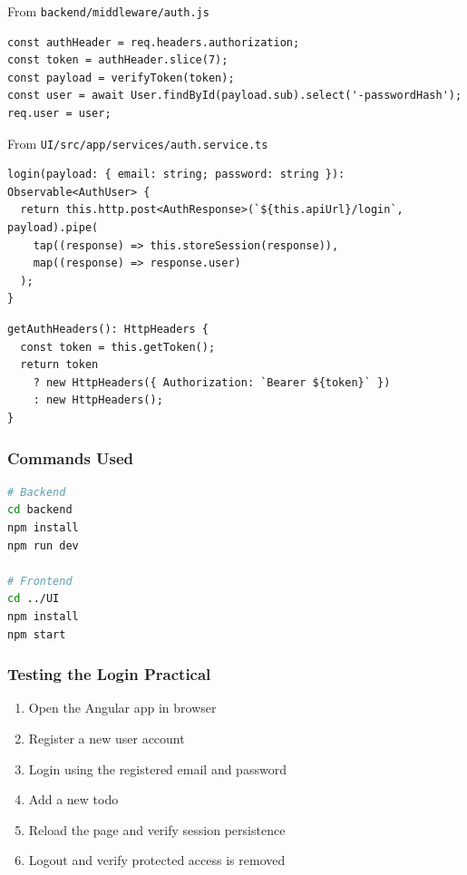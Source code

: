 \documentclass[12pt,a4paper]{article}
\begin{document}
From \texttt{backend/middleware/auth.js}
\begin{lstlisting}[style=projectcode]
const authHeader = req.headers.authorization;
const token = authHeader.slice(7);
const payload = verifyToken(token);
const user = await User.findById(payload.sub).select('-passwordHash');
req.user = user;
\end{lstlisting}

From \texttt{UI/src/app/services/auth.service.ts}
\begin{lstlisting}[style=projectcode]
login(payload: { email: string; password: string }): Observable<AuthUser> {
  return this.http.post<AuthResponse>(`${this.apiUrl}/login`, payload).pipe(
    tap((response) => this.storeSession(response)),
    map((response) => response.user)
  );
}
\end{lstlisting}

\begin{lstlisting}[style=projectcode]
getAuthHeaders(): HttpHeaders {
  const token = this.getToken();
  return token
    ? new HttpHeaders({ Authorization: `Bearer ${token}` })
    : new HttpHeaders();
}
\end{lstlisting}

\subsubsection*{Commands Used}
\begin{lstlisting}[style=projectcode,language=bash]
# Backend
cd backend
npm install
npm run dev

# Frontend
cd ../UI
npm install
npm start
\end{lstlisting}

\subsubsection*{Testing the Login Practical}
\begin{enumerate}
  \item Open the Angular app in browser
  \item Register a new user account
  \item Login using the registered email and password
  \item Add a new todo
  \item Reload the page and verify session persistence
  \item Logout and verify protected access is removed
\end{enumerate}
\end{document}
